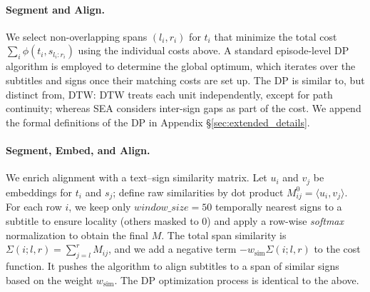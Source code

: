 \documentclass[11pt]{article}
\begin{document}
\paragraph{Segment and Align.}
We select non-overlapping spans $(l_i,r_i)$ for $t_i$ that minimize the total cost $\sum_i \phi(t_i,s_{l_i{:}r_i})$ using the individual costs above.
A standard episode-level DP algorithm is employed to determine the global optimum, which iterates over the subtitles and signs once their matching costs are set up.
The DP is similar to, but distinct from, DTW: DTW treats each unit independently, except for path continuity; whereas SEA considers inter-sign gaps as part of the cost.
We append the formal definitions of the DP in Appendix \S\ref{sec:extended_details}.

\paragraph{Segment, Embed, and Align.}
We enrich alignment with a text–sign similarity matrix. Let $u_i$ and $v_j$ be embeddings for $t_i$ and $s_j$; define raw similarities by dot product $M^0_{ij}{=}\langle u_i,v_j\rangle$. For each row $i$, we keep only $window\_size=50$ temporally nearest signs to a subtitle to ensure locality (others masked to $0$) and apply a row-wise \textit{softmax} normalization to obtain the final $M$. 
The total span similarity is $\Sigma(i;l,r){=}\sum_{j=l}^{r} M_{ij}$, and we add a negative term $-w_{\mathrm{sim}}\Sigma(i;l,r)$ to the cost function.
It pushes the algorithm to align subtitles to a span of similar signs based on the weight $w_{\mathrm{sim}}$.
The DP optimization process is identical to the above.
\end{document}

